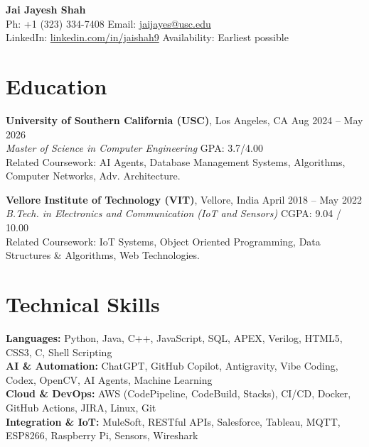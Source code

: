 \documentclass[letterpaper,10pt]{article}
\begin{document}
\begin{center}
    {\LARGE \textbf{Jai Jayesh Shah}} \\
    \vspace{2pt}
    \small
    Ph: +1 (323) 334-7408 \quad Email: \href{mailto:jaijayes@usc.edu}{jaijayes@usc.edu} \\
    LinkedIn: \href{https://www.linkedin.com/in/jaishah9}{linkedin.com/in/jaishah9} \quad Availability: Earliest possible \\
    \vspace{-8pt}
\end{center}

\section*{Education}
\textbf{University of Southern California (USC)}, Los Angeles, CA \hfill Aug 2024 -- May 2026 \\
\textit{Master of Science in Computer Engineering} \hfill GPA: 3.7/4.00 \\
Related Coursework: AI Agents, Database Management Systems, Algorithms, Computer Networks, Adv. Architecture.

\vspace{1pt}

\textbf{Vellore Institute of Technology (VIT)}, Vellore, India \hfill April 2018 -- May 2022 \\
\textit{B.Tech. in Electronics and Communication (IoT and Sensors)} \hfill CGPA: 9.04 / 10.00 \\
Related Coursework: IoT Systems, Object Oriented Programming, Data Structures \& Algorithms, Web Technologies.

\section*{Technical Skills}
\textbf{Languages:} Python, Java, C++, JavaScript, SQL, APEX, Verilog, HTML5, CSS3, C, Shell Scripting \\
\textbf{AI \& Automation:} ChatGPT, GitHub Copilot, Antigravity, Vibe Coding, Codex, OpenCV, AI Agents, Machine Learning \\
\textbf{Cloud \& DevOps:} AWS (CodePipeline, CodeBuild, Stacks), CI/CD, Docker, GitHub Actions, JIRA, Linux, Git \\
\textbf{Integration \& IoT:} MuleSoft, RESTful APIs, Salesforce, Tableau, MQTT, ESP8266, Raspberry Pi, Sensors, Wireshark
\end{document}
